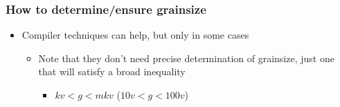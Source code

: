 \documentclass{beamer}
\begin{document}
\begin{frame}
  \frametitle{How to determine/ensure grainsize}
  \begin{itemize}
    \item Compiler techniques can help, but only in some cases
      \begin{itemize}
        \item Note that they don't need precise determination of grainsize,
          just one that will satisfy a broad inequality
          \begin{itemize}
            \item $kv < g < mkv$ ($10v < g < 100v$)
          \end{itemize}
      \end{itemize}
  \end{itemize}
\end{frame}
\end{document}
